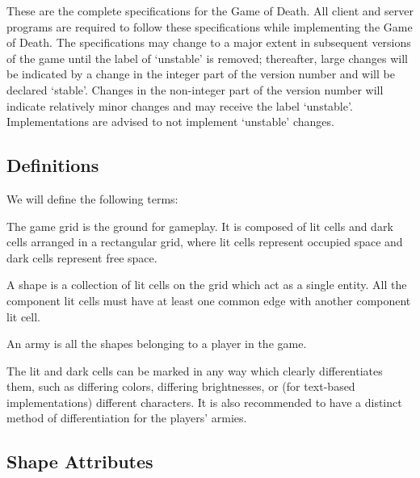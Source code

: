 \documentclass[a4paper,11pt]{article}
\begin{document}
These are the complete specifications for the Game of Death. All client and server programs are required to follow these specifications while implementing the Game of Death. The specifications may change to a major extent in subsequent versions of the game until the label of `unstable' is removed; thereafter, large changes will be indicated by a change in the integer part of the version number and will be declared `stable'. Changes in the non-integer part of the version number will indicate relatively minor changes and may receive the label `unstable'. Implementations are advised to not implement `unstable' changes.

\subsection{Definitions}

We will define the following terms:
\begin{description}
\addtolength{\itemsep}{-4pt}
    \item[game grid] The game grid is the ground for gameplay. It is composed of lit cells and dark cells arranged in a rectangular grid, where lit cells represent occupied space and dark cells represent free space.
    \item[shape] A shape is a collection of lit cells on the grid which act as a single entity. All the component lit cells must have at least one common edge with another component lit cell.
    \item[army] An army is all the shapes belonging to a player in the game.
\end{description}

The lit and dark cells can be marked in any way which clearly differentiates them, such as differing colors, differing brightnesses, or (for text-based implementations) different characters. It is also recommended to have a distinct method of differentiation for the players' armies.

\subsection{Shape Attributes}
\end{document}
